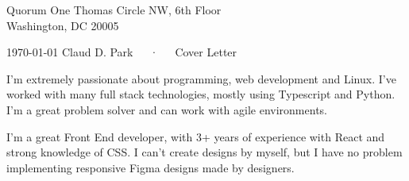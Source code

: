 


\recipient
  {Quorum}
  {One Thomas Circle NW, 6th Floor\\
  Washington, DC 20005 }




\makecvheader[R]

\makecvfooter
  {\today}
  {Claud D. Park~~~·~~~Cover Letter}
  {}

\makelettertitle

\begin{cvletter}

I'm extremely passionate about programming, web development
and Linux.
I've worked with many full stack technologies, mostly using
Typescript and Python.
I'm a great problem solver and can work with agile
environments.

I'm a great Front End developer, with 3+ years of experience with React and strong knowledge of CSS.
I can't create designs by myself, but I have no problem implementing responsive Figma designs made by designers.


\end{cvletter}


\makeletterclosing



